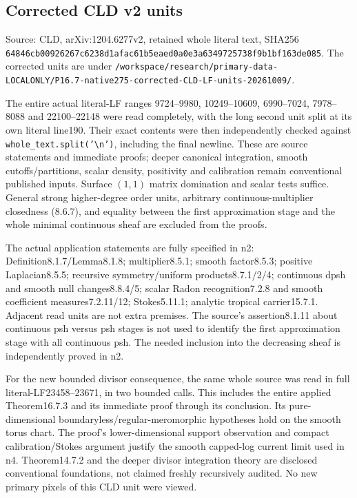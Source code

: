 \documentclass[11pt]{article}
\begin{document}
\subsection*{Corrected CLD v2 units}

Source: CLD, arXiv:1204.6277v2, retained whole literal text, SHA256 \texttt{64846cb00926267c6238d1afac61b5eaed0a0e3a6349725738f9b1bf163de085}. The corrected units are under \texttt{/workspace/research/primary-data-LOCALONLY/P16.7-native275-corrected-CLD-LF-units-20261009/}.

The entire actual literal-LF ranges 9724--9980, 10249--10609, 6990--7024, 7978--8088 and 22100--22148 were read completely, with the long second unit split at its own literal line190. Their exact contents were then independently checked against \texttt{whole\_text.split('\textbackslash{}n')}, including the final newline. These are source statements and immediate proofs; deeper canonical integration, smooth cutoffs/partitions, scalar density, positivity and calibration remain conventional published inputs. Surface $(1,1)$ matrix domination and scalar tests suffice. General strong higher-degree order units, arbitrary continuous-multiplier closedness (8.6.7), and equality between the first approximation stage and the whole minimal continuous sheaf are excluded from the proofs.

The actual application statements are fully specified in n2: Definition8.1.7/Lemma8.1.8; multiplier8.5.1; smooth factor8.5.3; positive Laplacian8.5.5; recursive symmetry/uniform products8.7.1/2/4; continuous dpsh and smooth null changes8.8.4/5; scalar Radon recognition7.2.8 and smooth coefficient measures7.2.11/12; Stokes5.11.1; analytic tropical carrier15.7.1. Adjacent read units are not extra premises. The source's assertion8.1.11 about continuous psh versus psh stages is not used to identify the first approximation stage with all continuous psh. The needed inclusion into the decreasing sheaf is independently proved in n2.

For the new bounded divisor consequence, the same whole source was read in full literal-LF23458--23671, in two bounded calls. This includes the entire applied Theorem16.7.3 and its immediate proof through its conclusion. Its pure-dimensional boundaryless/regular-meromorphic hypotheses hold on the smooth torus chart. The proof's lower-dimensional support observation and compact calibration/Stokes argument justify the smooth capped-log current limit used in n4. Theorem14.7.2 and the deeper divisor integration theory are disclosed conventional foundations, not claimed freshly recursively audited. No new primary pixels of this CLD unit were viewed.
\end{document}
